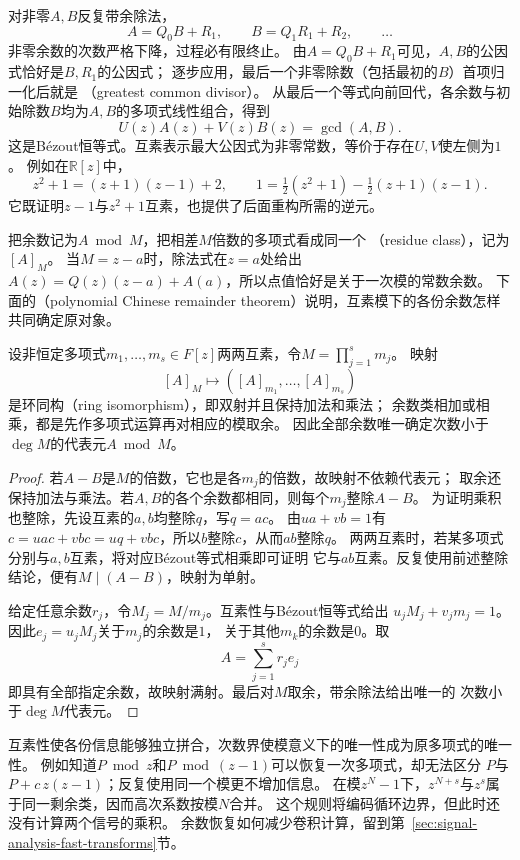 对非零$A,B$反复带余除法，
\[
  A=Q_0B+R_1,\qquad B=Q_1R_1+R_2,\qquad\ldots
\]
非零余数的次数严格下降，过程必有限终止。
由$A=Q_0B+R_1$可见，$A,B$的公因式恰好是$B,R_1$的公因式；
逐步应用，最后一个非零除数（包括最初的$B$）首项归一化后就是
（greatest common divisor）。
从最后一个等式向前回代，各余数与初始除数$B$均为$A,B$的多项式线性组合，得到
\begin{equation}
  U(z)A(z)+V(z)B(z)=\gcd(A,B).
  \label{eq:signal-analysis-polynomial-bezout}
\end{equation}
这是Bézout恒等式。互素表示最大公因式为非零常数，等价于存在$U,V$使左侧为$1$。
例如在$\mathbb R[z]$中，
\[
  z^2+1=(z+1)(z-1)+2,\qquad
  1=\tfrac12(z^2+1)-\tfrac12(z+1)(z-1).
\]
它既证明$z-1$与$z^2+1$互素，也提供了后面重构所需的逆元。

把余数记为$A\bmod M$，把相差$M$倍数的多项式看成同一个
（residue class），记为$[A]_M$。
当$M=z-a$时，除法式在$z=a$处给出
$A(z)=Q(z)(z-a)+A(a)$，所以点值恰好是关于一次模的常数余数。
下面的（polynomial Chinese remainder theorem）说明，互素模下的各份余数怎样共同确定原对象。
\begin{theorem}[多项式中国剩余定理]
  \label{thm:signal-analysis-polynomial-crt}
  设非恒定多项式$m_1,\ldots,m_s\in F[z]$两两互素，令$M=\prod_{j=1}^s m_j$。
  映射
  \[
    [A]_M\longmapsto([A]_{m_1},\ldots,[A]_{m_s})
  \]
  是环同构（ring isomorphism），即双射并且保持加法和乘法；
  余数类相加或相乘，都是先作多项式运算再对相应的模取余。
  因此全部余数唯一确定次数小于$\deg M$的代表元$A\bmod M$。
\end{theorem}
\begin{proof}
  若$A-B$是$M$的倍数，它也是各$m_j$的倍数，故映射不依赖代表元；
  取余还保持加法与乘法。若$A,B$的各个余数都相同，则每个$m_j$整除$A-B$。
  为证明乘积也整除，先设互素的$a,b$均整除$q$，写$q=ac$。
  由$ua+vb=1$有$c=uac+vbc=uq+vbc$，所以$b$整除$c$，从而$ab$整除$q$。
  两两互素时，若某多项式分别与$a,b$互素，将对应Bézout等式相乘即可证明
  它与$ab$互素。反复使用前述整除结论，便有$M\mid(A-B)$，映射为单射。

  给定任意余数$r_j$，令$M_j=M/m_j$。互素性与Bézout恒等式给出
  $u_jM_j+v_jm_j=1$。因此$e_j=u_jM_j$关于$m_j$的余数是$1$，
  关于其他$m_k$的余数是$0$。取
  \[
    A=\sum_{j=1}^s r_je_j
  \]
  即具有全部指定余数，故映射满射。最后对$M$取余，带余除法给出唯一的
  次数小于$\deg M$代表元。
\end{proof}

互素性使各份信息能够独立拼合，次数界使模意义下的唯一性成为原多项式的唯一性。
例如知道$P\bmod z$和$P\bmod(z-1)$可以恢复一次多项式，却无法区分
$P$与$P+c\,z(z-1)$；反复使用同一个模更不增加信息。
在模$z^N-1$下，$z^{N+s}$与$z^s$属于同一剩余类，因而高次系数按模$N$合并。
这个规则将编码循环边界，但此时还没有计算两个信号的乘积。
余数恢复如何减少卷积计算，留到第~\ref{sec:signal-analysis-fast-transforms}节。

